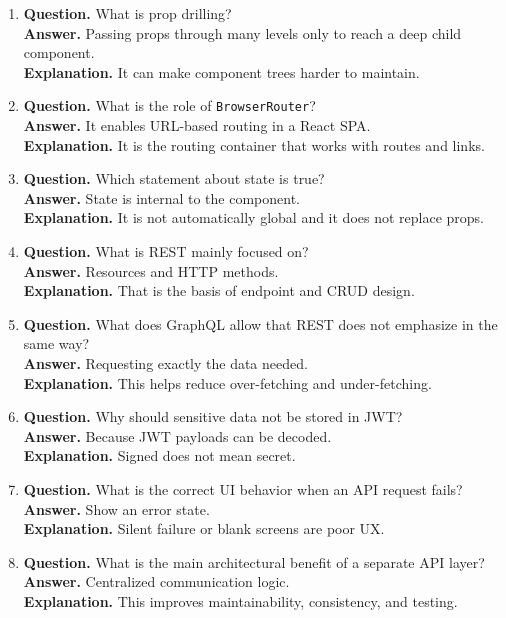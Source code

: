 \documentclass[11pt,a4paper]{article}
\begin{document}
\begin{enumerate}
  \item \textbf{Question.} What is prop drilling?\\
  \textbf{Answer.} Passing props through many levels only to reach a deep child component.\\
  \textbf{Explanation.} It can make component trees harder to maintain.

  \item \textbf{Question.} What is the role of \texttt{BrowserRouter}?\\
  \textbf{Answer.} It enables URL-based routing in a React SPA.\\
  \textbf{Explanation.} It is the routing container that works with routes and links.

  \item \textbf{Question.} Which statement about state is true?\\
  \textbf{Answer.} State is internal to the component.\\
  \textbf{Explanation.} It is not automatically global and it does not replace props.

  \item \textbf{Question.} What is REST mainly focused on?\\
  \textbf{Answer.} Resources and HTTP methods.\\
  \textbf{Explanation.} That is the basis of endpoint and CRUD design.

  \item \textbf{Question.} What does GraphQL allow that REST does not emphasize in the same way?\\
  \textbf{Answer.} Requesting exactly the data needed.\\
  \textbf{Explanation.} This helps reduce over-fetching and under-fetching.

  \item \textbf{Question.} Why should sensitive data not be stored in JWT?\\
  \textbf{Answer.} Because JWT payloads can be decoded.\\
  \textbf{Explanation.} Signed does not mean secret.

  \item \textbf{Question.} What is the correct UI behavior when an API request fails?\\
  \textbf{Answer.} Show an error state.\\
  \textbf{Explanation.} Silent failure or blank screens are poor UX.

  \item \textbf{Question.} What is the main architectural benefit of a separate API layer?\\
  \textbf{Answer.} Centralized communication logic.\\
  \textbf{Explanation.} This improves maintainability, consistency, and testing.
\end{enumerate}
\end{document}

